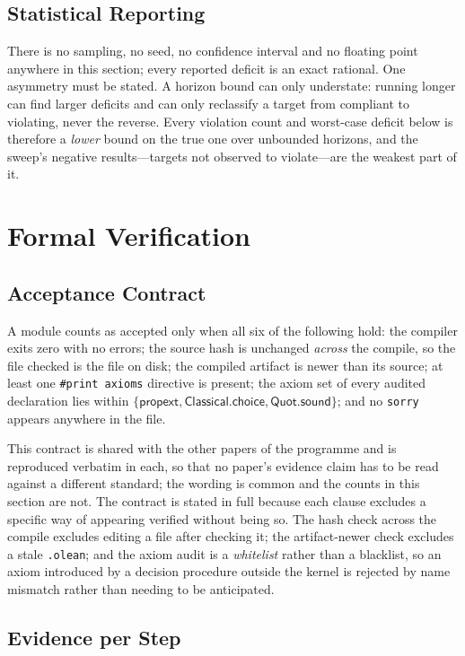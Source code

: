 \documentclass[conference]{IEEEtran}
\theoremstyle{definition}
\begin{document}
\subsection{Statistical Reporting}

There is no sampling, no seed, no confidence interval and no floating point anywhere in this
section; every reported deficit is an exact rational. One asymmetry must be stated. A horizon
bound can only understate: running longer can find larger deficits and can only reclassify a
target from compliant to violating, never the reverse. Every violation count and worst-case
deficit below is therefore a \emph{lower} bound on the true one over unbounded horizons, and
the sweep's negative results---targets not observed to violate---are the weakest part of it.

\section{Formal Verification}
\label{sec:verification}

\subsection{Acceptance Contract}

A module counts as accepted only when all six of the following hold: the compiler exits zero
with no errors; the source hash is unchanged \emph{across} the compile, so the file checked is
the file on disk; the compiled artifact is newer than its source; at least one
\texttt{\#print axioms} directive is present; the axiom set of every audited declaration lies
within $\{\textsf{propext},\textsf{Classical.choice},\textsf{Quot.sound}\}$; and no
\texttt{sorry} appears anywhere in the file.

This contract is shared with the other papers of the programme and is reproduced verbatim in
each, so that no paper's evidence claim has to be read against a different standard; the
wording is common and the counts in this section are not. The contract is stated in full
because each clause excludes a specific way of appearing verified without being so. The hash check across the compile excludes editing a file after
checking it; the artifact-newer check excludes a stale \texttt{.olean}; and the axiom audit is
a \emph{whitelist} rather than a blacklist, so an axiom introduced by a decision procedure
outside the kernel is rejected by name mismatch rather than needing to be anticipated.

\subsection{Evidence per Step}
\end{document}
